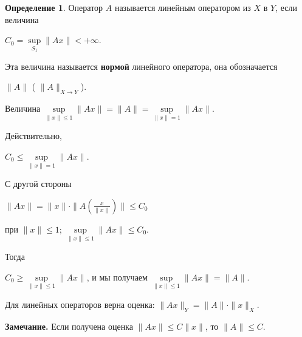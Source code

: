 \documentclass[12pt,a4paper,titlepage, oneside]{book}
\theoremstyle{definition}
\newtheorem*{definition}{Определение}
\theoremstyle{plain}
\theoremstyle{remark}
\theoremstyle{remark}
\theoremstyle{remark}
\theoremstyle{remark}
\theoremstyle{plain}
\theoremstyle{plain}
\begin{document}
\begin{definition} Оператор $A$ называется линейным оператором из $X$ в $Y$, если величина 
\begin{center}
$ C_0=\underset{S_1}{\sup}\parallel Ax \parallel<+\infty $.
\end{center}
\end{definition}

Эта величина называется \textbf{нормой} линейного оператора, она обозначается
\begin{center}
$\parallel A \parallel$ 
( $\parallel A \parallel _{X \to Y}$).
\end{center}

Величина $\underset{\parallel x\parallel \leq1}{\sup}\parallel Ax \parallel =
\parallel A \parallel =
\underset{\parallel x\parallel=1}{\sup}\parallel Ax \parallel$.

Действительно,
\begin{center}
$C_0\leq 
\underset{\parallel x\parallel=1}{\sup}\parallel Ax \parallel$.
\end{center}

С другой стороны 
\begin{center}
$\parallel Ax \parallel=
\parallel x \parallel \cdot \parallel A(\frac{x}{\parallel x \parallel}) \parallel \leq C_0$
\end{center} 
при $\parallel x \parallel \leq 1$; 
$\underset{\parallel x\parallel \leq 1}{\sup}\parallel Ax \parallel \leq C_0$.

Тогда 
\begin{center}
$ C_0 \geq\underset{\parallel x\parallel \leq 1}{\sup}\parallel Ax \parallel $, и мы получаем 
$\underset{\parallel x\parallel \leq 1}{\sup}\parallel Ax \parallel =\parallel A \parallel$.
\end{center}

Для линейных операторов верна оценка: $\parallel Ax \parallel _{Y} =\parallel A \parallel \cdot \parallel x \parallel_{X} $.

\textbf{Замечание.} Если получена оценка  $\parallel Ax \parallel \leq {C}  \parallel x \parallel$, то $\parallel A \parallel \leq {C} $.
\end{document}
